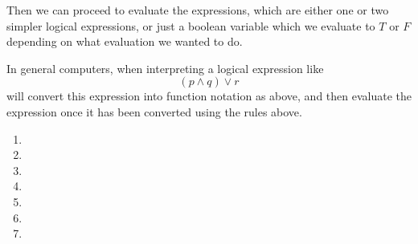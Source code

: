 Then we can proceed to evaluate the expressions, which are either one or two simpler logical expressions, or just a boolean variable which we evaluate to $T$ or $F$ depending on what evaluation we wanted to do.

In general computers, when interpreting a logical expression like
\[(p \land q) \lor r\]
will convert this expression into function notation as above, and then evaluate the expression once it has been converted using the rules above.
\begin{enumerate}
   \item 
    \item 
    \item 
    \item 
    \item 
    \item 
    \item 
 \end{enumerate}
